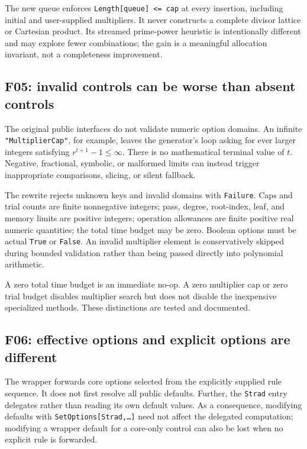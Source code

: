 \documentclass[11pt,letterpaper]{article}
\newcommand{\code}[1]{\texttt{#1}}
\theoremstyle{definition}
\begin{document}
The new queue enforces \code{Length[queue] <= cap} at every insertion, including initial and user-supplied multipliers. It never constructs a complete divisor lattice or Cartesian product. Its streamed prime-power heuristic is intentionally different and may explore fewer combinations; the gain is a meaningful allocation invariant, not a completeness improvement.

\subsection{F05: invalid controls can be worse than absent controls}

The original public interfaces do not validate numeric option domains. An infinite \code{"MultiplierCap"}, for example, leaves the generator's loop asking for ever larger integers satisfying $r^{t+1}-1\le\infty$. There is no mathematical terminal value of $t$. Negative, fractional, symbolic, or malformed limits can instead trigger inappropriate comparisons, slicing, or silent fallback.

The rewrite rejects unknown keys and invalid domains with \code{Failure}. Caps and trial counts are finite nonnegative integers; pass, degree, root-index, leaf, and memory limits are positive integers; operation allowances are finite positive real numeric quantities; the total time budget may be zero. Boolean options must be actual \code{True} or \code{False}. An invalid multiplier element is conservatively skipped during bounded validation rather than being passed directly into polynomial arithmetic.

A zero total time budget is an immediate no-op. A zero multiplier cap or zero trial budget disables multiplier search but does not disable the inexpensive specialized methods. These distinctions are tested and documented.

\subsection{F06: effective options and explicit options are different}

The wrapper forwards core options selected from the explicitly supplied rule sequence. It does not first resolve all public defaults. Further, the \code{Strad} entry delegates rather than reading its own default values. As a consequence, modifying defaults with \code{SetOptions[Strad,\ldots]} need not affect the delegated computation; modifying a wrapper default for a core-only control can also be lost when no explicit rule is forwarded.
\end{document}
